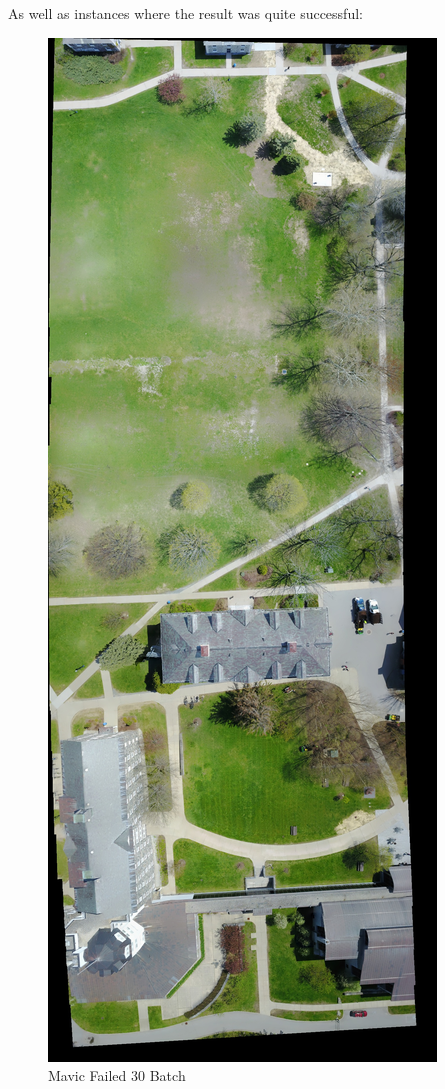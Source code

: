 As well as instances where the result was quite successful:

\begin{figure}[htbp]
\centering
\includegraphics[keepaspectratio,width=\textwidth,height=0.75\textheight]{images/mavic_batches/successful30batch.JPG}
\caption{Mavic Failed 30 Batch}
\end{figure}

